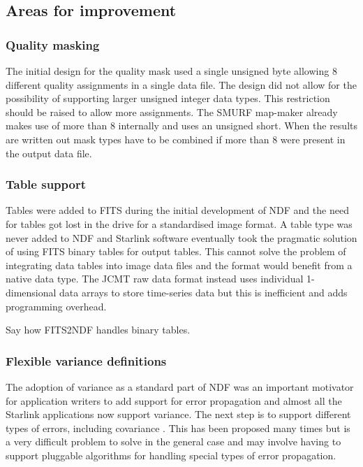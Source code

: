 \documentclass[final,authoryear,5p,times,twocolumn]{elsarticle}
\begin{document}
\subsection{Areas for improvement}

\subsubsection{Quality masking}

The initial design for the quality mask used a single unsigned byte
allowing 8 different quality assignments in a single data file. The
design did not allow for the possibility of supporting larger unsigned
integer data types. This restriction should be raised to allow more
assignments. The SMURF map-maker
\citep[][ascl:1310.007]{2013MNRAS.430.2545C} already makes use of more
than 8 internally and uses an unsigned short. When the results are
written out mask types have to be combined if more than 8 were present
in the output data file.

\subsubsection{Table support}

Tables were added to FITS \citep{1988A&AS...73..365H} during the
initial development of NDF and the need for tables got lost in the
drive for a standardised image format. A table type was never added to
NDF and Starlink software eventually took the pragmatic solution of
using FITS binary tables \citep{1995A&AS..113..159C} for output
tables. This cannot solve the problem of integrating data tables into
image data files and the format would benefit from a native data
type. The JCMT raw data format instead uses individual 1-dimensional
data arrays to store time-series data but this is inefficient and adds
programming overhead.

{\color{red} Say how FITS2NDF handles binary tables.}

\subsubsection{Flexible variance definitions}

The adoption of variance as a standard part of NDF was an important
motivator for application writers to add support for error propagation and
almost all the Starlink applications now support variance. The next
step is to support different types of errors, including
covariance \citep[see e.g.][]{1992ESOC...41...47M}. This has been proposed many times \citep[see
e.g.][]{1991STARB...8...19M} but is a very difficult problem to solve
in the general case and may involve having to support pluggable
algorithms for handling special types of error propagation.
\end{document}
